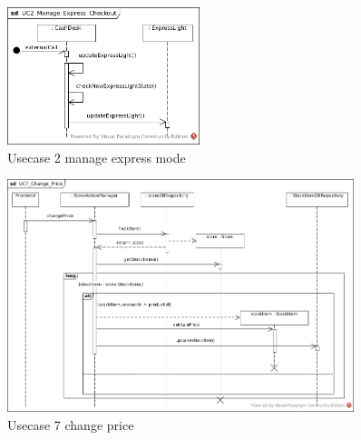 			\begin{figure}[!h]
				\centering
				\includegraphics[width = 0.5\textwidth]{img/UC2_Manage_Express_Checkout.jpg}
				\caption{Usecase 2 manage express mode}
				\label{MS_UC2}
			\end{figure}
			
			\begin{figure}[!h]
				\centering
				\includegraphics[width = 0.9\textwidth]{img/UC7_Change_Price.jpg}
				\caption{Usecase 7 change price}
				\label{MS_UC7}
			\end{figure}
			

